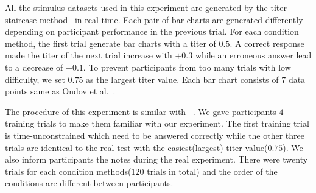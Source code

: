All the stimulus datasets used in this experiment are generated by the titer staircase method~\cite{Ondov19} in real time. Each pair of bar charts are generated differently depending on participant performance in the previous trial. For each condition method, the first trial generate bar charts with a titer of $0.5$. A correct response made the titer of the next trial increase with $+0.3$ while an erroneous answer lead to a decrease of $-0.1$. To prevent participants from too many trials with low difficulty, we set $0.75$ as the largest titer value. Each bar chart consists of 7 data points same as Ondov et al.~\cite{Ondov19}.

The procedure of this experiment is similar with ~\cite{Ondov19}. 
We gave participants $4$ training trials to make them familiar with our experiment. The first training trial is time-unconstrained which need to be answered correctly while the other three trials are identical to the real test with the easiest(largest) titer value($0.75$). We also inform participants the notes during the real experiment. There were twenty trials for each condition methods($120$ trials in total) and the order of the conditions are different between participants. 